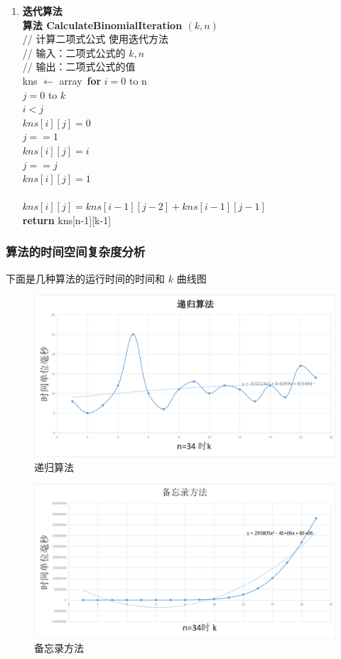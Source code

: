\documentclass{ctexart}
\newcommand\tab[1][1cm]{\hspace*{#1}}
\begin{document}
\begin{enumerate}
   \item {\bfseries 迭代算法} \\
	{\bfseries{算法 CalculateBinomialIteration $(k, n)$ }} \\
	\tab// 计算二项式公式 使用迭代方法 \\
	\tab// 输入：二项式公式的 $k, n$ \\
	\tab// 输出：二项式公式的值 \\
	kns $\leftarrow$ array\
	{\bfseries for} $i = 0$ to n \\
	\tab {\bfseries for } $j = 0$ to $k$ \\
	\tab {\bfseries if} $i < j$ \\
	\tab\tab $kns[i][j] = 0$ \\
	\tab {\bfseries else if} $j == 1$ \\
	\tab\tab $kns[i][j] = i$ \\
	\tab {\bfseries else if} $j == j$ \\
	\tab\tab $kns[i][j] = 1$ \\
	\tab {\bfseries else} \\
	\tab\tab $kns[i][j] = kns[i-1][j-2] + kns[i-1][j-1]$ \\
	{\bfseries return} kns[n-1][k-1]
\end{enumerate}
\subsubsection{算法的时间空间复杂度分析}
下面是几种算法的运行时间的时间和 $k$ 曲线图
\begin{figure}[H]
	\centering
	\includegraphics[scale=0.5]{../images/recursion.png}
	\caption{递归算法}
\end{figure}

\begin{figure}[H]
	\centering
	\includegraphics[scale=0.5]{../images/memo.png}
	\caption{备忘录方法}
\end{figure}
\end{document}

